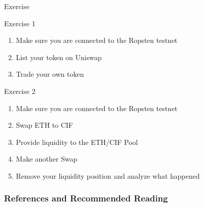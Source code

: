 \documentclass[]{beamer}
\begin{document}
\begin{frame}{Exercise}
	\begin{exercise}{Exercise 1}
		\begin{enumerate}
			\item Make sure you are connected to the Ropsten testnet
			\item List your token on Uniswap
			\item Trade your own token
		\end{enumerate}
	\end{exercise}
	
	\begin{exercise}{Exercise 2}
		\begin{enumerate}
			\item Make sure you are connected to the Ropsten testnet
			\item Swap ETH to CIF
			\item Provide liquidity to the ETH/CIF Pool
			\item Make another Swap
			\item Remove your liquidity position and analyze what happened
		\end{enumerate}
	\end{exercise}
\end{frame}



\begin{frame}%
\frametitle{References and Recommended Reading}

		
		
	
\end{frame}
\end{document}
